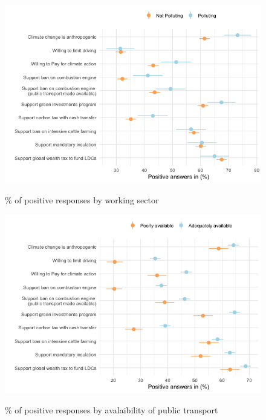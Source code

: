 	\begin{frame}{}%
	\begin{figure}[h!]
	\caption{\% of positive responses by working sector}
	\includegraphics[width=.7\paperwidth]{../figures/FR/positive_all_by_polluting_sector_FR.png} \\
	\end{figure}
	\end{frame}
	
	\begin{frame}{}%
	\begin{figure}[h!]
	\caption{\% of positive responses by avalaibility of public transport}
	\includegraphics[width=.7\paperwidth]{../figures/FR/positive_all_by_availability_transport_FR.png} \\
	\end{figure}
	\end{frame}
	
